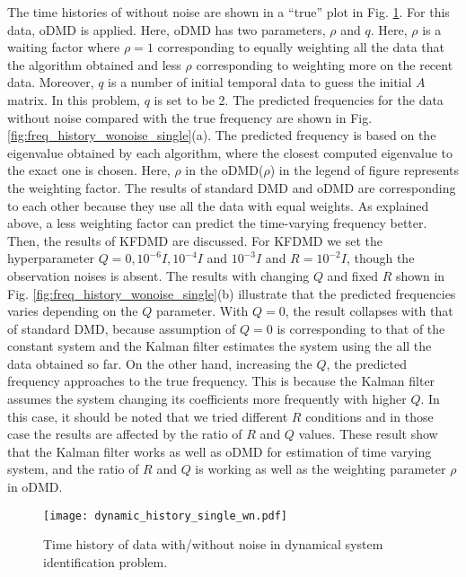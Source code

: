 \documentclass[aip,graphicx]{revtex4-1}
\begin{document}
The time histories of without noise are shown in a ``true'' plot in Fig. \ref{fig:dynamic_history_single_wn}. For this data, oDMD is applied. Here, oDMD has two parameters, $\rho$ and $q$. Here, $\rho$ is a waiting factor where $\rho=1$ corresponding to equally weighting all the data that the algorithm obtained and less $\rho$ corresponding to weighting more on the recent data. Moreover, $q$ is a number of initial temporal data to guess the initial $A$ matrix.  In this problem, $q$ is set to be 2. The predicted frequencies for the data without noise compared with the true frequency are shown in Fig. \ref{fig:freq_history_wonoise_single}(a). The predicted frequency is based on the eigenvalue obtained by each algorithm, where the closest computed eigenvalue to the exact one is chosen.  Here, $\rho$ in the oDMD($\rho$) in the legend of figure represents the weighting factor. The results of standard DMD and oDMD are corresponding to each other because they use all the data with equal weights.  As explained above, a less weighting factor can predict the time-varying frequency better. Then, the results of KFDMD are discussed. For KFDMD we set the hyperparameter $Q=0, 10^{-6}I,10^{-4}I$ and $10^{-3}I$ and $R=10^{-2}I$, though the observation noises is absent. The results with changing $Q$ and fixed $R$ shown in Fig. \ref{fig:freq_history_wonoise_single}(b) illustrate that the predicted frequencies varies depending on the $Q$ parameter. With $Q=0$, the result collapses with that of standard DMD, because assumption of $Q=0$ is corresponding to that of the constant system and the Kalman filter estimates the system using the all the data obtained so far. On the other hand, increasing the $Q$, the predicted frequency approaches to the true frequency. This is because the Kalman filter assumes the system changing its coefficients more frequently with higher $Q$. In this case, it should be noted that we tried different $R$ conditions and in those case the results are affected by the ratio of $R$ and $Q$ values. These result show that the Kalman filter works as well as oDMD for estimation of time varying system, and the ratio of $R$ and $Q$ is working as well as the weighting parameter $\rho$ in oDMD. 

\begin{figure}
	\texttt{[image: dynamic\_history\_single\_wn.pdf]}
	\caption{Time history of data with/without noise in dynamical system identification problem.}
	\label{fig:dynamic_history_single_wn}
\end{figure}
\end{document}

